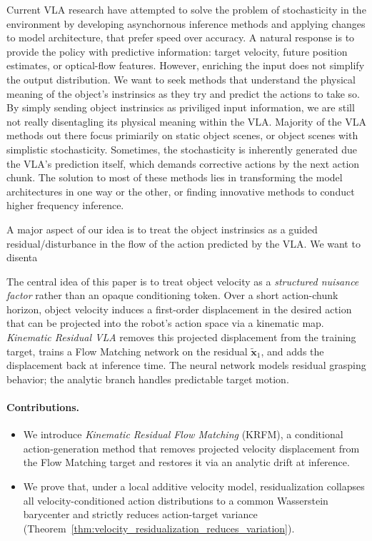 \documentclass{article} %
\begin{document}
Current VLA research have attempted to solve the problem of stochasticity in the environment by developing asynchornous inference methods and applying changes to model architecture, that prefer speed over accuracy. A natural response is to provide the policy with predictive information: target velocity, future position estimates, or optical-flow features. However, enriching the input does not simplify the output distribution. We want to seek methods that understand the physical meaning of the object's instrinsics as they try and predict the actions to take so. By simply sending object instrinsics as priviliged input information, we are still not really disentagling its physical meaning within the VLA. 
Majority of the VLA methods out there focus primiarily on static object scenes, or object scenes with simplistic stochasticity. Sometimes, the stochasticity is inherently generated due the VLA's prediction itself, which demands corrective actions by the next action chunk. The solution to most of these methods lies in transforming the model architectures in one way or the other, or finding innovative methods to conduct higher frequency inference.  

A major aspect of our idea is to treat the object instrinsics as a guided residual/disturbance in the flow of the action predicted by the VLA. We want to disenta

The central idea of this paper is to treat object velocity as a \emph{structured nuisance factor} rather than an opaque conditioning token. Over a short action-chunk horizon, object velocity induces a first-order displacement in the desired action that can be projected into the robot's action space via a kinematic map. \emph{Kinematic Residual VLA} removes this projected displacement from the training target, trains a Flow Matching network on the residual $\widetilde{\mathbf x}_1$, and adds the displacement back at inference time. The neural network models residual grasping behavior; the analytic branch handles predictable target motion.

\paragraph{Contributions.}
\begin{itemize}
    \item We introduce \emph{Kinematic Residual Flow Matching} (KRFM), a conditional action-generation method that removes projected velocity displacement from the Flow Matching target and restores it via an analytic drift at inference.
    \item We prove that, under a local additive velocity model, residualization collapses all velocity-conditioned action distributions to a common Wasserstein barycenter and strictly reduces action-target variance (Theorem~\ref{thm:velocity_residualization_reduces_variation}).

\end{itemize}
\end{document}

